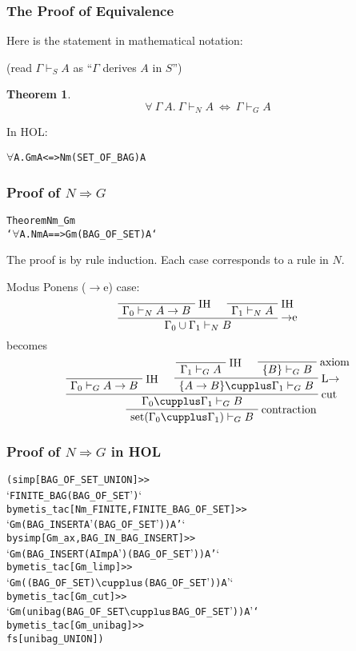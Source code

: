 \documentclass[english,svgnames,hide notes,12pt]{beamer}
\newtheorem{thm}{Theorem}
\theoremstyle{definition}
\theoremstyle{remark}
\begin{document}
\begin{frame}[fragile]
    \frametitle{The Proof of Equivalence}
    Here is the statement in mathematical notation:

    (read $\Gamma\vdash_S A$ as ``$\Gamma$ derives $A$ in $S$'')
    \begin{thm}
        \[\forall ~\Gamma ~A. ~\Gamma \vdash_N A ~\Leftrightarrow~ \Gamma \vdash_G A\]
    \end{thm}
    In HOL:

    \begin{alltt}
        \(\forall\) \textGamma A. Gm \textGamma A <=> Nm (SET_OF_BAG \textGamma) A
    \end{alltt}
\end{frame}

\begin{frame}[fragile]
    \frametitle{Proof of $N\Rightarrow G$}
\small
\begin{alltt}
Theorem Nm_Gm
    `\(\forall\) \textGamma A. Nm \textGamma A ==> Gm (BAG_OF_SET \textGamma) A`
\end{alltt}
The proof is by rule induction. Each case corresponds to a rule in $N$.

Modus Ponens ($\to$e) case:
\[
    \AxiomC{}
    \RightLabel{IH}
    \UnaryInfC{$\Gamma_0\vdash_N A\to B$}
    \AxiomC{}
    \RightLabel{IH}
    \UnaryInfC{$\Gamma_1\vdash_N A$}
    \RightLabel{$\to$e}
    \BinaryInfC{$\Gamma_0\cup\Gamma_1 \vdash_N B$}
    \DisplayProof
\]
becomes
\[
    \AxiomC{}
    \RightLabel{IH}
    \UnaryInfC{$\Gamma_0 \vdash_G A \to B$}
    \AxiomC{}
    \RightLabel{IH}
    \UnaryInfC{$\Gamma_1 \vdash_G A$}
    \AxiomC{}
    \RightLabel{axiom}
    \UnaryInfC{$\{B\} \vdash_G B$}
    \RightLabel{L$\to$}
    \BinaryInfC{$\{A\to B\}\cupplus\Gamma_1\vdash_G B$}
    \RightLabel{cut}
    \BinaryInfC{$\Gamma_0\cupplus\Gamma_1\vdash_G B$}
    \RightLabel{contraction}
    \UnaryInfC{$\text{set}(\Gamma_0\cupplus\Gamma_1)\vdash_G B$}
    \DisplayProof
\]

\end{frame}

\begin{frame}[fragile]
    \frametitle{Proof of $N\Rightarrow G$ in HOL}
    \small
\begin{alltt}
(simp[BAG_OF_SET_UNION] >>
`FINITE_BAG (BAG_OF_SET \textGamma')`
  by metis_tac[Nm_FINITE,FINITE_BAG_OF_SET] >>
`Gm (BAG_INSERT A' (BAG_OF_SET \textGamma')) A'`
  by simp[Gm_ax,BAG_IN_BAG_INSERT] >>
`Gm (BAG_INSERT (A Imp A') (BAG_OF_SET \textGamma')) A'`
  by metis_tac[Gm_limp] >>
`Gm ((BAG_OF_SET \textGamma) \(\cupplus\) (BAG_OF_SET \textGamma')) A'`
  by metis_tac[Gm_cut] >>
`Gm (unibag (BAG_OF_SET \textGamma \(\cupplus\) BAG_OF_SET \textGamma')) A'`
  by metis_tac[Gm_unibag] >>
fs[unibag_UNION])
\end{alltt}
\end{frame}
\end{document}
